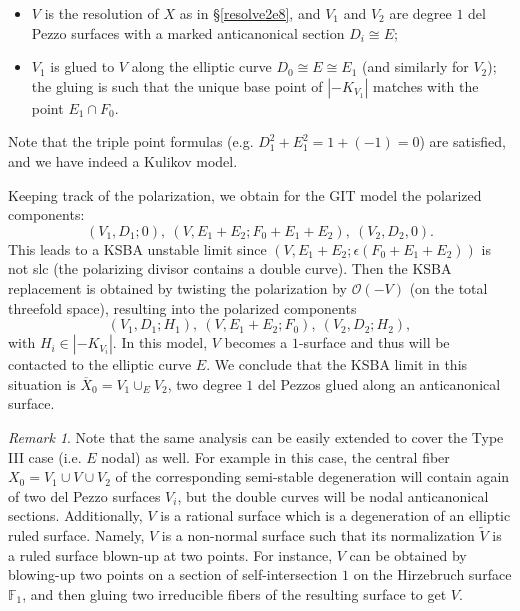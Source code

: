 \documentclass{amsart}
\numberwithin{equation}{section}
\theoremstyle{plain}
\theoremstyle{remark}
\newtheorem{remark}[equation]{Remark}
\theoremstyle{definition}
\newcommand{\bF}{\mathbb{F}}
\newcommand{\calO}{\mathcal{O}}
\begin{document}
\begin{itemize}
\item $V$ is the resolution of $X$ as in \S\ref{resolve2e8}, and $V_1$ and $V_2$ are degree $1$ del Pezzo surfaces with a marked anticanonical section $D_i\cong E$; 
\item $V_1$ is glued to $V$ along the elliptic curve $D_0\cong E\cong E_1$ (and similarly for $V_2$); the gluing is such that the unique base point of $|-K_{V_1}|$ matches with the point $E_1\cap F_0$. 
\end{itemize} 
Note that the triple point formulas (e.g.  $D_1^2+E_1^2=1+(-1)=0$) are satisfied, and we have indeed a Kulikov model. 

Keeping track of the polarization, we obtain for the GIT model the polarized components: 
$$(V_1,D_1;0),\ (V,E_1+E_2;F_0+E_1+E_2),\ (V_2,D_2,0).$$
This leads to a KSBA unstable limit since $(V,E_1+E_2;\epsilon(F_0+E_1+E_2))$ is not slc (the polarizing divisor contains a double curve). Then the KSBA replacement is obtained by twisting the polarization by $\calO(-V)$ (on the total threefold space), resulting into the polarized components
$$(V_1,D_1;H_1),\ (V,E_1+E_2;F_0),\ (V_2,D_2;H_2),$$
with $H_i\in|-K_{V_i}|$. In this model, $V$ becomes a $1$-surface and thus will be contacted to the elliptic curve $E$. We conclude that the KSBA limit in this situation is $\overline{X}_0=V_1\cup_EV_2$, two  degree $1$ del Pezzos glued along an anticanonical surface. 

\begin{remark}
Note that the same analysis can be easily extended to cover the Type III case (i.e. $E$ nodal) as well. For example in this case, the central fiber  $X_0=V_1\cup V\cup V_2$ of the corresponding semi-stable degeneration  will contain again of two del Pezzo surfaces $V_i$, but the double curves will be nodal anticanonical sections. Additionally, $V$ is a rational surface which is a degeneration of an elliptic ruled surface. Namely,  $V$ is a non-normal surface such that its normalization $\widetilde V$ is a ruled surface blown-up at two points. For instance, $V$ can be obtained by blowing-up two points on a section of self-intersection $1$ on the Hirzebruch surface $\bF_1$, and then gluing two irreducible fibers of the resulting surface to get $V$.
\end{remark}

\end{document}
